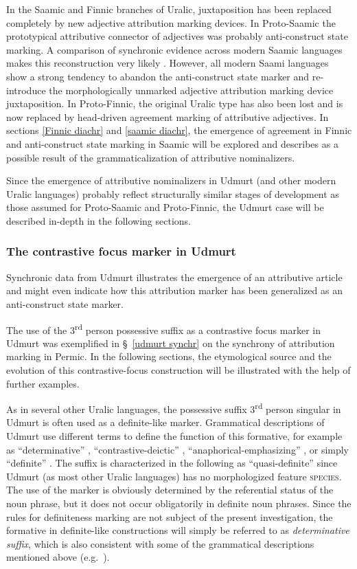 In the Saamic and Finnic branches of Uralic, juxtaposition has been replaced completely by new adjective attribution marking devices. In Proto-Saamic the prototypical attributive connector of adjectives was probably anti-construct state marking. A comparison of synchronic evidence across modern Saamic languages makes this reconstruction very likely  \citep{riesler2006b}. However, all modern Saami languages show a strong tendency to abandon the anti-construct state marker and re-introduce the morphologically unmarked adjective attribution marking device juxtaposition. In Proto-Finnic, the original Uralic type has also been lost and is now replaced by head-driven agreement marking of attributive adjectives. In sections \ref{Finnic diachr} and \ref{saamic diachr}, the emergence of agreement in Finnic and anti-construct state marking in Saamic will be explored and describes as a possible result of the grammaticalization of attributive nominalizers. 

Since the emergence of attributive nominalizers in Udmurt (and other modern Uralic languages) probably reflect structurally similar stages of development as those assumed for Proto-Saamic and Proto-Finnic, the Udmurt case will be described in-depth in the following sections.

\subsubsection{The contrastive focus marker in Udmurt} \label{udmurt diachr}
Synchronic data from Udmurt illustrates the emergence of an attributive article and might even indicate how this attribution marker has been generalized as an anti-construct state marker. 

The use of the 3\textsuperscript{rd} person possessive suffix as a contrastive focus marker in Udmurt was exemplified in \S~\ref{udmurt synchr} on the synchrony of attribution marking in Permic. In the following sections, the etymological source and the evolution of this contrastive-focus construction will be illustrated with the help of further examples.

As in several other Uralic languages, the possessive suffix 3\textsuperscript{rd} person singular in Udmurt is often used as a definite-like marker. Grammatical descriptions of Udmurt use different terms to define the function of this formative, for example as “determinative” \citep{kelmakov-etal1999}, “contrastive-deictic” \citep{alatyrev1970}, “anaphorical-emphasizing” \citep{kiekbaev1965}, or simply “definite” \citep{winkler2001}. The suffix is characterized in the following as “quasi-definite” since Udmurt (as most other Uralic languages) has no morphologized feature \textsc{species}. The use of the marker is obviously determined by the referential status of the noun phrase, but it does not occur obligatorily in definite noun phrases. Since the rules for definiteness marking are not subject of the present investigation, the formative in definite-like constructions will simply be referred to as \textit{determinative suffix}, which is also consistent with some of the grammatical descriptions mentioned above (e.g.~\citealt{kelmakov-etal1999}).

